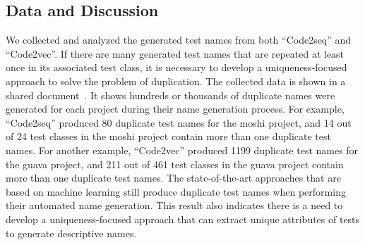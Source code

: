 \begin{appendices}
\subsection{Data and Discussion}

We collected and analyzed the generated test names from both \enquote{Code2seq} and \enquote{Code2vec}.
%
If there are many generated test names that are repeated at least once in its associated test class, it is necessary to develop a uniqueness-focused approach to solve the problem of duplication.
%
The collected data is shown in a shared document~\cite{CodeResult}.
%
It shows hundreds or thousands of duplicate names were generated for each project during their name generation process. 
%
For example, \enquote{Code2seq} produced \num{80} duplicate test names for the moshi project, and \num{14} out of \num{24} test classes in the moshi project contain more than one duplicate test names.
%
For another example, \enquote{Code2vec} produced \num{1199} duplicate test names for the guava project, and \num{211} out of \num{461} test classes in the guava project contain more than one duplicate test names.
%
The state-of-the-art approaches that are based on machine learning still produce duplicate test names when performing their automated name generation.
%
This result also indicates there is a need to develop a uniqueness-focused approach that can extract unique attributes of tests to generate descriptive names.


\end{appendices}